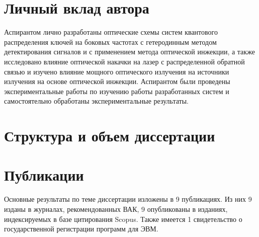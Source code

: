\section*{Личный вклад автора}
Аспирантом лично разработаны оптические схемы систем квантового распределения ключей на боковых частотах с гетеродинным методом детектирования сигналов и с применением метода оптической инжекции, а также исследовано влияние оптической накачки на лазер с распределенной обратной связью и изучено влияние мощного оптического излучения на источники излучения на основе оптической инжекции. Аспирантом были проведены экспериментальные работы по изучению работы разработанных систем и самостоятельно обработаны экспериментальные результаты.
\section*{Структура и объем диссертации}
\section*{Публикации}
Основные результаты по теме диссертации изложены в 9 публикациях. Из них 9 изданы в журналах, рекомендованных ВАК, 9 опубликованы в изданиях, индексируемых в базе цитирования Scopus. Также имеется 1 свидетельство о государственной регистрации программ для ЭВМ.\\

